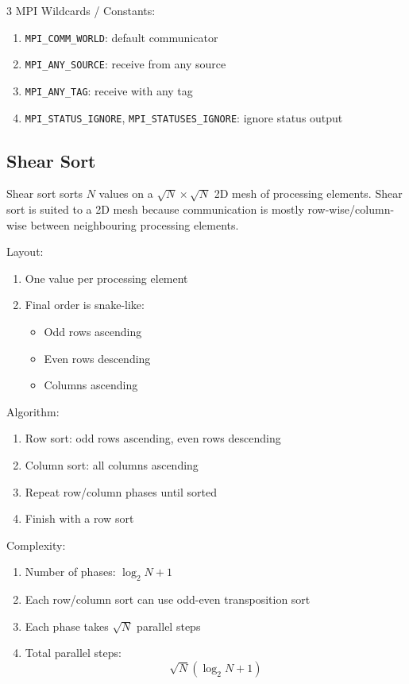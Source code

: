 \documentclass[12pt, a4paper]{article}
\begin{document}
\begin{multicols*}{3}
MPI Wildcards / Constants:
\begin{enumerate}[\roman*.]
  \item \lstinline|MPI_COMM_WORLD|: default communicator
  \item \lstinline|MPI_ANY_SOURCE|: receive from any source
  \item \lstinline|MPI_ANY_TAG|: receive with any tag
  \item \lstinline|MPI_STATUS_IGNORE|, \lstinline|MPI_STATUSES_IGNORE|: ignore status output
\end{enumerate}

\colbreak 

\subsection{Shear Sort}

Shear sort sorts $N$ values on a $\sqrt{N}\times\sqrt{N}$ 2D mesh of processing elements. Shear sort is suited to a 2D mesh because communication is mostly row-wise/column-wise between neighbouring processing elements.

Layout:
\begin{enumerate}[\roman*.]
  \item One value per processing element
  \item Final order is snake-like:
    \begin{itemize}[leftmargin=*]\vspace{3pt}
      \item Odd rows ascending
      \item Even rows descending
      \item Columns ascending
    \end{itemize}
\end{enumerate}

Algorithm:
\begin{enumerate}[\roman*.]
  \item Row sort: odd rows ascending, even rows descending
  \item Column sort: all columns ascending
  \item Repeat row/column phases until sorted
  \item Finish with a row sort
\end{enumerate}

Complexity:
\begin{enumerate}[\roman*.]
  \item Number of phases: $\log_2 N + 1$
  \item Each row/column sort can use odd-even transposition sort
  \item Each phase takes $\sqrt{N}$ parallel steps
  \item Total parallel steps:
    \[
      \sqrt{N}(\log_2 N + 1)
    \]
\end{enumerate}



\end{multicols*}
\end{document}
